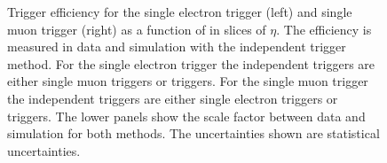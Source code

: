 \begin{figure}[htbp!]
  \begin{center}
      \caption{Trigger efficiency for the single electron trigger (left) and single muon trigger (right) as a function of \pt in slices of $\eta$. The efficiency is measured in data and simulation with the independent trigger method. For the single electron trigger the independent triggers are either single muon triggers or \ETm triggers. For the single muon trigger the independent triggers are either single electron triggers or \ETm triggers.
      The lower panels show the scale factor between data and simulation for both methods. The uncertainties shown are statistical uncertainties.}  
    \label{fig:Clos_sil}
  \end{center}
\end{figure}



